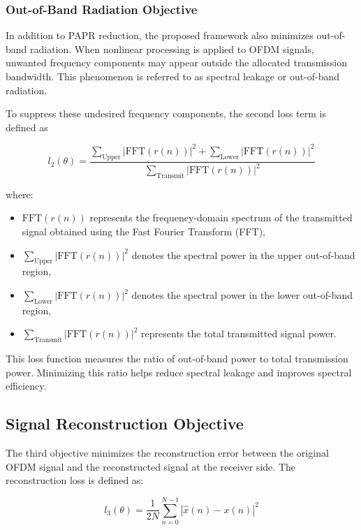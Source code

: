 \subsubsection{Out-of-Band Radiation Objective}

In addition to PAPR reduction, the proposed framework also minimizes out-of-band radiation. When nonlinear processing is applied to OFDM signals, unwanted frequency components may appear outside the allocated transmission bandwidth. This phenomenon is referred to as spectral leakage or out-of-band radiation.

To suppress these undesired frequency components, the second loss term is defined as

\begin{equation*}
    l_2(\theta)=
    \frac{
    \sum_{\text{Upper}} |\mathrm{FFT}(r(n))|^2
    +
    \sum_{\text{Lower}} |\mathrm{FFT}(r(n))|^2
    }
    {
    \sum_{\text{Transmit}} |\mathrm{FFT}(r(n))|^2
    }
\end{equation*}

where:

\begin{itemize}
    \item $\mathrm{FFT}(r(n))$ represents the frequency-domain spectrum of the transmitted signal obtained using the Fast Fourier Transform (FFT),
    \item $\sum_{\text{Upper}} |\mathrm{FFT}(r(n))|^2$ denotes the spectral power in the upper out-of-band region,
    \item $\sum_{\text{Lower}} |\mathrm{FFT}(r(n))|^2$ denotes the spectral power in the lower out-of-band region,
    \item $\sum_{\text{Transmit}} |\mathrm{FFT}(r(n))|^2$ represents the total transmitted signal power.
\end{itemize}

This loss function measures the ratio of out-of-band power to total transmission power. Minimizing this ratio helps reduce spectral leakage and improves spectral efficiency.

\subsection{Signal Reconstruction Objective}

The third objective minimizes the reconstruction error between the original OFDM signal and the reconstructed signal at the receiver side. The reconstruction loss is defined as:

\begin{equation*}
    l_3(\theta)=\frac{1}{2N}\sum_{n=0}^{N-1}|\hat{x}(n)-x(n)|^2
\end{equation*}

